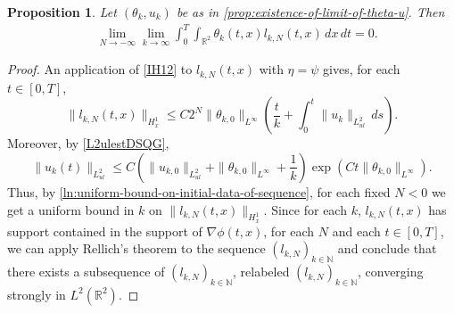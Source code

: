 \documentclass[11pt,reqno,xcolor=svgnames]{amsart}
\def\R{{\mathbb R}}
\def\N{{\mathbb N}}
\theoremstyle{plain}
\newtheorem{prop}[theorem]{Proposition}
\theoremstyle{definition}
\theoremstyle{plain}
\theoremstyle{remark}
\begin{document}
\begin{prop}\label{prop:convergence1}
Let $(\theta_k, u_k)$ be as in \cref{prop:existence-of-limit-of-theta-u}.  Then
\begin{equation}\label{convergence}
\begin{split}
&\lim_{N\rightarrow -\infty}\lim_{k\rightarrow\infty} \int_0^T\int_{\R^2} \theta_k(t,x)l_{k,N}(t,x) \, dx \, dt=0. 
\end{split}
\end{equation}    
\end{prop}
\begin{proof}
    
An application of \cref{IH12} to $l_{k,N}(t,x)$ with $\eta=\psi$ gives, for each $t\in [0,T]$,
\begin{equation*}
\| l_{k,N}(t,x) \|_{H^1_x} \leq C2^{N}\| \theta_{k,0}\|_{L^{\infty}}\left(\frac{t}{k} + \int_0^t \| u_k \|_{L^2_{ul}}\, ds\right).
\end{equation*}
Moreover, by \cref{L2ulestDSQG},
\begin{equation*}
\| u_k(t) \|_{L^2_{ul}} \leq C\left(\| u_{k,0} \|_{L^2_{ul}} + \|\theta_{k,0} \|_{L^{\infty}} + \frac{1}{k}\right)\exp \left( Ct\|\theta_{k,0}\|_{L^{\infty}}\right).
\end{equation*}
Thus, by \cref{ln:uniform-bound-on-initial-data-of-sequence}, for each fixed $N<0$ we get a uniform bound in $k$ on $\| l_{k,N}(t,x) \|_{H^1_x}$.  Since for each $k$, $l_{k,N}(t,x)$ has support contained in the support of $\nabla\phi(t,x)$, for each $N$ and each $t\in [0,T]$, we can apply Rellich's theorem to the sequence $( l_{k,N})_{k\in\N}$ and conclude that there exists a subsequence of $( l_{k,N})_{k\in\N}$, relabeled $( l_{k,N})_{k\in\N}$, converging strongly in $L^2(\R^2)$.  


\end{proof}
\end{document}
